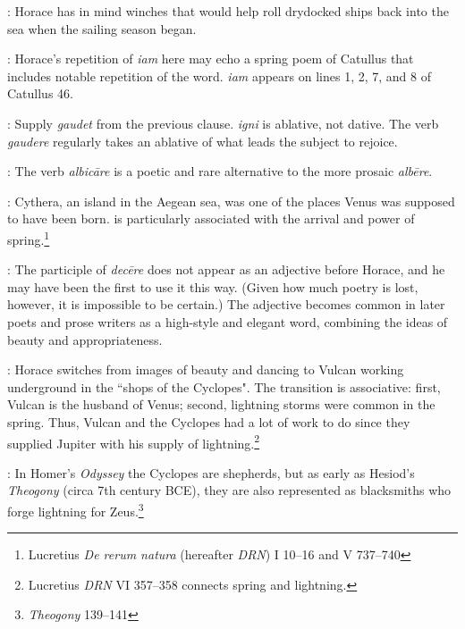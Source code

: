 
: Horace has in mind winches that would help roll drydocked ships back into the sea when the sailing season began.


: Horace's repetition of \textit{iam} here may echo a spring poem of Catullus that includes notable repetition of the word.  \textit{iam} appears on lines 1, 2, 7, and 8 of Catullus 46.


: Supply \textit{gaudet} from the previous clause.  \textit{igni} is ablative, not dative.  The verb \textit{gaudere} regularly takes an ablative of what leads the subject to rejoice.


: The verb \textit{albicāre} is a poetic and rare alternative to the more prosaic \textit{albēre}.


: Cythera, an island in the Aegean sea, was one of the places Venus was supposed to have been born.\indent{} is particularly associated with the arrival and power of spring.\footnote{Lucretius \textit{De rerum natura} (hereafter \textit{DRN}) I 10--16 and V 737--740}


: The participle of \textit{decēre} does not appear as an adjective before Horace, and he may have been the first to use it this way.  (Given how much poetry is lost, however, it is impossible to be certain.)  The adjective becomes common in later poets and prose writers as a high-style and elegant word, combining the ideas of beauty and appropriateness.


: Horace switches from images of beauty and dancing to Vulcan working underground in the ``shops of the Cyclopes".  The transition is associative: first, Vulcan is the husband of Venus; second, lightning storms were common in the spring.  Thus, Vulcan and the Cyclopes had a lot of work to do since they supplied Jupiter with his supply of lightning.\footnote{Lucretius \textit{DRN} VI 357--358 connects spring and lightning.}


: In Homer's \textit{Odyssey} the Cyclopes are shepherds, but as early as Hesiod's \textit{Theogony} (circa 7th century BCE), they are also represented as blacksmiths who forge lightning for Zeus.\footnote{\textit{Theogony} 139--141}

